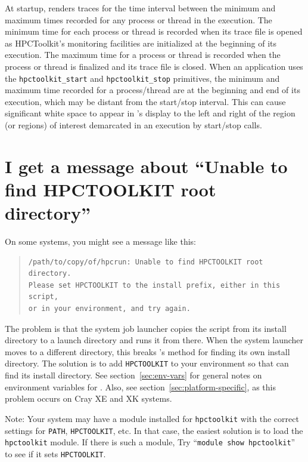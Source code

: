 \documentclass[11pt,letterpaper]{report}
\begin{document}
At startup, \hpctraceviewer{}  renders traces for the time interval between the minimum and maximum times recorded for any process or thread in the execution. The minimum time for each process or thread is recorded when its trace file is opened as HPCToolkit's monitoring facilities are initialized at the beginning of its execution. The maximum time for a process or thread is recorded when the process or thread is finalized and its trace file is closed. When an application uses the \verb|hpctoolkit_start| and \verb|hpctoolkit_stop| primitives, the minimum and maximum time recorded for a process/thread are  at the beginning and end of its execution, which may be  distant from the start/stop interval. This can cause significant white space to appear in \hpctraceviewer{}'s display to the left and right of the region (or regions) of interest demarcated in an execution by start/stop calls.


\section{I get a message about ``Unable to find HPCTOOLKIT root directory''}

On some systems, you might see a message like this:
\begin{quote}
\begin{verbatim}
/path/to/copy/of/hpcrun: Unable to find HPCTOOLKIT root directory.
Please set HPCTOOLKIT to the install prefix, either in this script,
or in your environment, and try again.
\end{verbatim}
\end{quote}


The problem is that the system job launcher copies the \hpcrun{}
script from its install directory to a launch directory and runs
it from there.  When the system launcher moves \hpcrun{} to a different directory, this
breaks \hpcrun{}'s method for finding its own install directory.
The solution is to add \verb|HPCTOOLKIT| to your environment so that
\hpcrun{} can find its install directory. See section~\ref{sec:env-vars} for
general notes on environment variables for \hpcrun{}. Also, see section~\ref{sec:platform-specific},
as this problem occurs on Cray XE and XK systems.

Note: Your system may have a module installed for \verb|hpctoolkit| with the
correct settings for \verb|PATH|, \verb|HPCTOOLKIT|, etc.  In that case,
the easiest solution is to load the \verb|hpctoolkit| module.  If there is
such a module, Try
``\verb|module show hpctoolkit|'' to see if it sets \verb|HPCTOOLKIT|.
\end{document}
